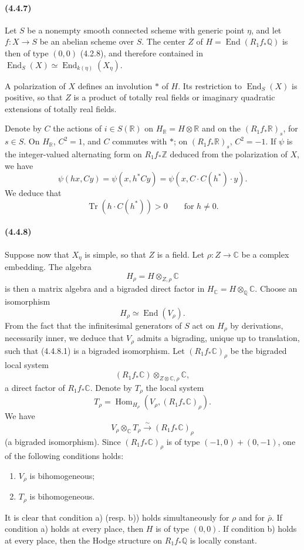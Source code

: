 \documentclass[10pt]{article}
\newcommand{\C}{\mathbb C}
\newcommand{\Q}{\mathbb Q}
\newcommand{\Z}{\mathbb Z}
\newcommand{\Hom}{\operatorname{Hom}}
\newcommand{\iso}{\xrightarrow{\sim}}
\newcommand{\R}{\mathbb R}
\providecommand{\End}{\operatorname{End}}
\newcommand{\Tr}{\operatorname{Tr}}
\begin{document}
\paragraph{(4.4.7)} Let $S$ be a nonempty smooth connected scheme with generic point $\eta$, and let $f:X\to S$ be an abelian scheme over $S$. The center $Z$ of $H=\End(R_1f_*\Q)$ is then of type $(0,0)$ (4.2.8), and therefore contained in $\End_S(X)\simeq \End_{k(\eta)}(X_\eta)$.

A polarization of $X$ defines an involution $*$ of $H$. Its restriction to $\End_S(X)$ is positive, so that $Z$ is a product of totally real fields or imaginary quadratic extensions of totally real fields.

Denote by $C$ the actions of $i\in S(\R)$ on $H_\R=H\otimes\R$ and on the $(R_1f_*\R)_s$, for $s\in S$. On $H_\R$, $C^2=1$, and $C$ commutes with $*$; on $(R_1f_*\R)_s$, $C^2=-1$. If $\psi$ is the integer-valued alternating form on $R_1f_*\Z$ deduced from the polarization of $X$, we have
\[
\psi(hx,Cy)=\psi(x,h^*Cy)=\psi(x,C\cdot C(h^*)\cdot y).
\]
We deduce that
\[
\tag{4.4.7.1}
\Tr(h\cdot C(h^*))>0\qquad\text{for }h\ne0.
\]

\paragraph{(4.4.8)} Suppose now that $X_\eta$ is simple, so that $Z$ is a field. Let $\rho:Z\to\C$ be a complex embedding. The algebra
\[
H_\rho=H\otimes_{Z,\rho}\C
\]
is then a matrix algebra and a bigraded direct factor in $H_\C=H\otimes_\Q\C$. Choose an isomorphism
\[
\tag{4.4.8.1}
H_\rho\simeq\End(V_\rho).
\]
From the fact that the infinitesimal generators of $S$ act on $H_\rho$ by derivations, necessarily inner, we deduce that $V_\rho$ admits a bigrading, unique up to translation, such that (4.4.8.1) is a bigraded isomorphism. Let $(R_1f_*\C)_\rho$ be the bigraded local system
\[
(R_1f_*\C)\otimes_{Z\otimes\C,\rho}\C,
\]
a direct factor of $R_1f_*\C$. Denote by $T_\rho$ the local system
\[
T_\rho=\Hom_{H_\rho}(V_\rho,(R_1f_*\C)_\rho).
\]
We have
\[
\tag{4.4.8.2}
V_\rho\otimes_\C T_\rho\iso (R_1f_*\C)_\rho
\]
(a bigraded isomorphism). Since $(R_1f_*\C)_\rho$ is of type $(-1,0)+(0,-1)$, one of the following conditions holds:
\begin{enumerate}[label=\alph*)]
\item $V_\rho$ is bihomogeneous;
\item $T_\rho$ is bihomogeneous.
\end{enumerate}
It is clear that condition a) (resp. b)) holds simultaneously for $\rho$ and for $\bar\rho$. If condition a) holds at every place, then $H$ is of type $(0,0)$. If condition b) holds at every place, then the Hodge structure on $R_1f_*\Q$ is locally constant.
\end{document}

